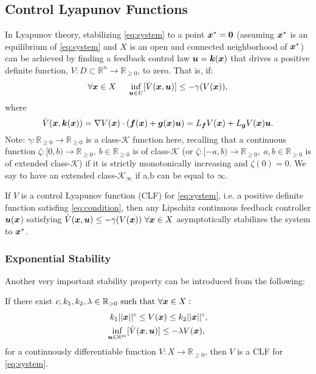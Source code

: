 \subsection{Control Lyapunov Functions}
In Lyapunov theory, stabilizing \eqref{eq:system} to a point $\boldsymbol{x}^*=\boldsymbol{0}$ (assuming 
$\boldsymbol{x}^*$ is an equilibrium of \eqref{eq:system} and 
$X$ is an open and connected neighborhood of $\boldsymbol{x}^*$) can be achieved by finding a feedback control law $\boldsymbol{u}=\boldsymbol{k}(\boldsymbol{x})$ that drives a positive definite function, $V: D \subset \mathbb{R}^n \to \mathbb{R}_{\geq 0}$, to zero. That is, if:
\begin{equation}
    \forall \boldsymbol{x}\in X ~~~~ \inf_{\boldsymbol{u}\in U}[\dot{V}(\boldsymbol{x},\boldsymbol{u})] \leq -\gamma(V(\boldsymbol{x})),
\label{eq:condition}
\end{equation}
where
\begin{equation}
    \dot{V}(\boldsymbol{x},\boldsymbol{k}(\boldsymbol{x})) = \nabla V(\boldsymbol{x})\cdot(\boldsymbol{f}(\boldsymbol{x})+\boldsymbol{g}(\boldsymbol{x})\boldsymbol{u})= L_{\boldsymbol{f}}V(\boldsymbol{x})+L_{\boldsymbol{g}}V(\boldsymbol{x})\boldsymbol{u}.
\label{eq:vdot}
\end{equation}
Note: $\gamma : \mathbb{R}_{\geq 0} \to \mathbb{R}_{\geq 0} $ is a class-$\mathcal{K}$ function here, 
recalling that a continuous function $\zeta : [0, b) \to \mathbb{R}_{\geq 0},~b \in \mathbb{R}_{\geq 0}$ is of class-$\mathcal{K}$ (or $\zeta : [-a, b) \to \mathbb{R}_{\geq 0},~a,b \in \mathbb{R}_{\geq 0}$ is of extended class-$\mathcal{K}$) if it is strictly monotonically increasing and $\zeta(0) = 0$. We say to have an extended class-$\mathcal{K}_\infty$ if a,b can be equal to $\infty$.
\begin{theorem}\label{th:clft}
If $V$ is a control Lyapunov function (CLF) for \eqref{eq:system}, i.e. a positive definite function satisfing \eqref{eq:condition}, then any Lipschitz continuous feedback controller $\boldsymbol{u}(\boldsymbol{x}$) satisfying $\dot{V}(\boldsymbol{x},\boldsymbol{u}) \leq -\gamma(V(\boldsymbol{x}))~\forall \boldsymbol{x}\in X$ asymptotically stabilizes the system to $\boldsymbol{x}^*$.
\end{theorem}
\subsubsection{Exponential Stability}
Another very important stability property can be introduced from the following:
\begin{definition}
If there exist $c,k_1,k_2,\lambda \in \mathbb{R}_{> 0} \text{~such that~} \forall \boldsymbol{x} \in X:$ 
\begin{equation}
    \begin{split}
    k_1||\boldsymbol{x}||^c \leq V(\boldsymbol{x}) \leq k_2||\boldsymbol{x}||^c,  \\
    \inf_{{\boldsymbol{u}\in \mathbb{R}^m}}[\dot{V}(\boldsymbol{x},\boldsymbol{u})] \leq -\lambda V(\boldsymbol{x}),~
    \end{split}
    \label{eq:expstabcond}
\end{equation}
for a continuously differentiable function $V : X \to \mathbb{R}_{\geq 0}$, then $V$ is a CLF for \eqref{eq:system}.
\label{def:expclf}
\end{definition}

